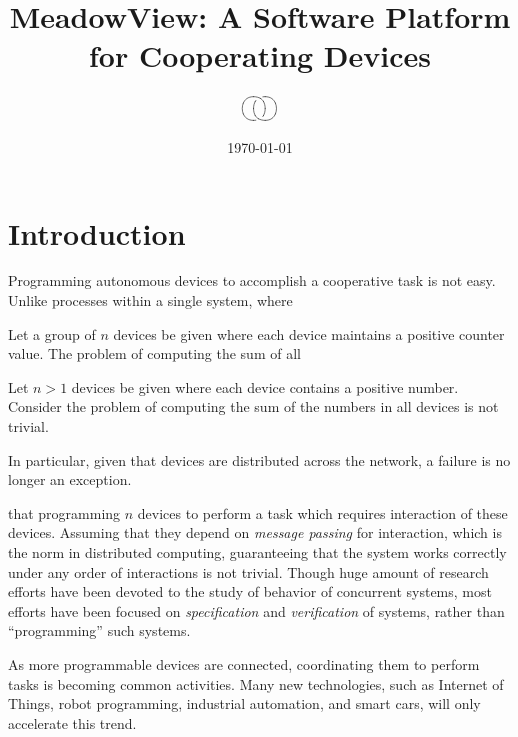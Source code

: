 \documentclass{note}
\begin{document}
\small


\title{\large\bf{}\textcolor{blue2}{MeadowView:  A Software Platform for
    Cooperating Devices}}
\author{
$$\xy
\xygraph{!{0;/r0.7pc/:} !{\vover}[u]
  !{\hcap[-2]} [d] !{\vover-} [ruu] !{\hcap[2]}}
\endxy$$
}
\date{\normalsize\today}
\maketitle


\tableofcontents

\section{Introduction}
Programming autonomous devices to accomplish a cooperative task is not easy.
Unlike processes within a single system, where 


Let a group of $n$ devices be given where each device maintains a positive
counter value. The problem of computing the sum of all 


Let $n > 1$ devices be given where each device contains
a positive number. Consider the problem of computing the sum of the 
numbers in all devices is not trivial. 

In particular, given that devices are distributed across the network, 
a failure is no longer an exception. 


that programming $n$ devices to 
perform a task which requires interaction of these devices.
Assuming that they depend on {\em message passing\/} for interaction,
which is the norm in distributed computing, 
guaranteeing that the system works correctly under any order of
interactions is not trivial. Though huge amount of research efforts
have been devoted to the study of behavior of concurrent systems, 
most efforts have been focused on
{\em specification\/} and {\em verification\/} of systems, rather than 
``programming'' such systems.%

As more programmable devices are connected, coordinating them
to perform tasks is becoming common activities. Many new 
technologies, such as Internet of Things, robot programming, industrial
automation, and smart cars, will only accelerate this trend.
\end{document}
